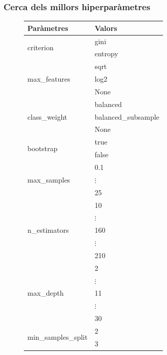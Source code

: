 \documentclass[a4paper, 11pt]{article}
\begin{document}
\newpage
\subsubsection{Cerca dels millors hiperparàmetres}\label{bona_randomforest}
\begin{figure}[h] %
\begin{minipage}{8cm} %
\begin{center} %
    \begin{tabular}{l|l}
        \textbf{Paràmetres} & \textbf{Valors} \\\hline\hline
        \multirow{2}{*}{criterion} & gini\\
        &\cellcolor{lightapricot}entropy\\\hline
        \multirow{3}{*}{max_features} & sqrt\\
        & log2 \\ 
        & \cellcolor{lightapricot}None\\\hline
        \multirow{3}{*}{class\_weight} & \cellcolor{lightapricot}balanced\\
        &balanced\_subsample\\
        & None\\ \hline
        \multirow{2}{*}{bootstrap} & \cellcolor{lightapricot}true\\
        & false\\\hline
        \multirow{3}{*}{max\_samples} & \cellcolor{lightapricot}0.1\\
        & $\vdots$\\
        & 25\\\hline
        \multirow{5}{*}{n\_estimators} & 10\\
        & $\vdots$\\
        & \cellcolor{lightapricot}160\\
        & $\vdots$\\
        & 210\\\hline
        \multirow{5}{*}{max\_depth} & 2\\
        & $\vdots$\\
        & \cellcolor{lightapricot}11\\
        & $\vdots$\\
        & 30\\\hline
         \multirow{5}{*}{min\_samples\_split} & 2\\
        & \cellcolor{lightapricot}3\\

\end{tabular}
\end{center}
\end{minipage}
\end{figure}
\end{document}
